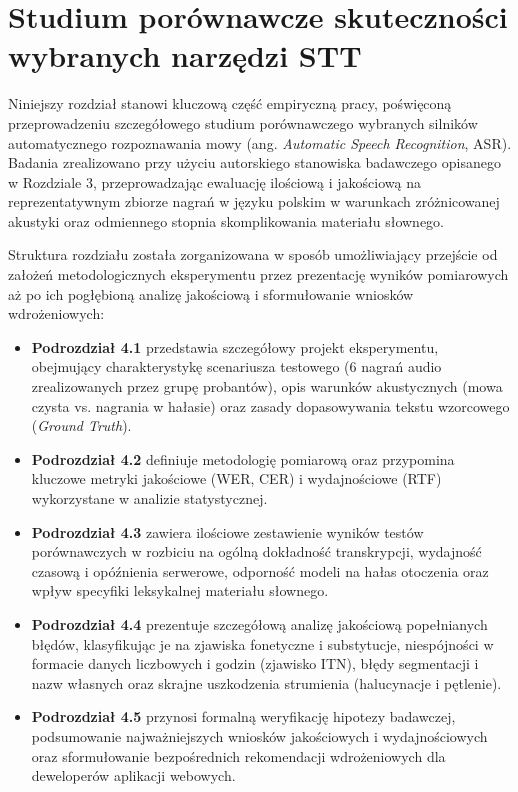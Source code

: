 
\section{Studium porównawcze skuteczności wybranych narzędzi STT}
\label{sec:comparative_study}

Niniejszy rozdział stanowi kluczową część empiryczną pracy, poświęconą przeprowadzeniu szczegółowego studium porównawczego wybranych silników automatycznego rozpoznawania mowy (ang. \textit{Automatic Speech Recognition}, ASR). Badania zrealizowano przy użyciu autorskiego stanowiska badawczego opisanego w Rozdziale 3, przeprowadzając ewaluację ilościową i jakościową na reprezentatywnym zbiorze nagrań w języku polskim w warunkach zróżnicowanej akustyki oraz odmiennego stopnia skomplikowania materiału słownego.

Struktura rozdziału została zorganizowana w sposób umożliwiający przejście od założeń metodologicznych eksperymentu przez prezentację wyników pomiarowych aż po ich pogłębioną analizę jakościową i sformułowanie wniosków wdrożeniowych:
\begin{itemize}
    \item \textbf{Podrozdział 4.1} przedstawia szczegółowy projekt eksperymentu, obejmujący charakterystykę scenariusza testowego (6 nagrań audio zrealizowanych przez grupę probantów), opis warunków akustycznych (mowa czysta vs. nagrania w hałasie) oraz zasady dopasowywania tekstu wzorcowego (\textit{Ground Truth}).
    \item \textbf{Podrozdział 4.2} definiuje metodologię pomiarową oraz przypomina kluczowe metryki jakościowe (WER, CER) i wydajnościowe (RTF) wykorzystane w analizie statystycznej.
    \item \textbf{Podrozdział 4.3} zawiera ilościowe zestawienie wyników testów porównawczych w rozbiciu na ogólną dokładność transkrypcji, wydajność czasową i opóźnienia serwerowe, odporność modeli na hałas otoczenia oraz wpływ specyfiki leksykalnej materiału słownego.
    \item \textbf{Podrozdział 4.4} prezentuje szczegółową analizę jakościową popełnianych błędów, klasyfikując je na zjawiska fonetyczne i substytucje, niespójności w formacie danych liczbowych i godzin (zjawisko ITN), błędy segmentacji i nazw własnych oraz skrajne uszkodzenia strumienia (halucynacje i pętlenie).
    \item \textbf{Podrozdział 4.5} przynosi formalną weryfikację hipotezy badawczej, podsumowanie najważniejszych wniosków jakościowych i wydajnościowych oraz sformułowanie bezpośrednich rekomendacji wdrożeniowych dla deweloperów aplikacji webowych.
\end{itemize}

